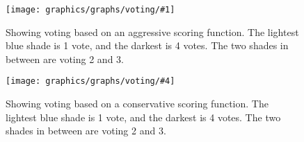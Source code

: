 \newcommand{\votinggraphs}[6]{
    \begin{figure}[h!]
    \begin{minipage}[t]{0.5\textwidth}
        \texttt{[image: graphics/graphs/voting/\#1]}
        \caption{#2}
        \label{#3}
    \end{minipage}
    \hspace*{\fill} %
    \begin{minipage}[t]{0.5\textwidth}
        \texttt{[image: graphics/graphs/voting/\#4]}
        \caption{#5}
        \label{#6}
    \end{minipage}
    \end{figure}
}

\newcommand{\easyvotinggraphs}[5]{ %
  \votinggraphs
  {voting-False_cover_rate_(FCR)-#1-Aggressive.pdf}{#2}{#3}
  {voting-False_cover_rate_(FCR)-#1-Conservative.pdf}{#4}{#5}
}


\easyvotinggraphs{Events_hit_rate_(EHR)}
{Showing voting based on an aggressive scoring function. The lightest blue shade is 1 vote, and the darkest is 4 votes. The two shades in between are voting 2 and 3.}{fig:voting_aggresive_ehr}
{Showing voting based on a conservative scoring function. The lightest blue shade is 1 vote, and the darkest is 4 votes. The two shades in between are voting 2 and 3.}{fig:voting_conservative_ehr}


